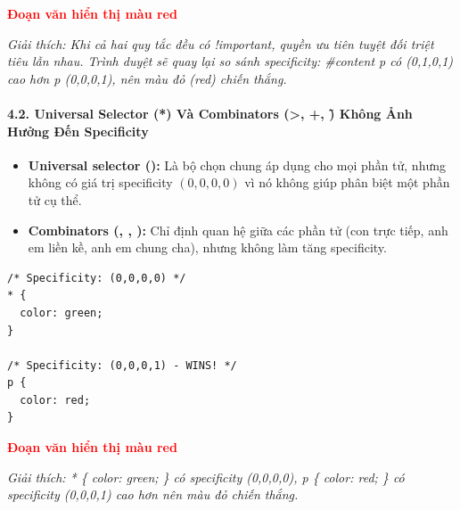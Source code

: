 \begin{browserWindow}
\sffamily\small
\textcolor{red}{\textbf{Đoạn văn hiển thị màu red}} \par\vspace{4pt}
{\scriptsize\textcolor{gray!60}{\textit{Giải thích: Khi cả hai quy tắc đều có !important, quyền ưu tiên tuyệt đối triệt tiêu lẫn nhau. Trình duyệt sẽ quay lại so sánh specificity: \#content p có (0,1,0,1) cao hơn p (0,0,0,1), nên màu đỏ (red) chiến thắng.}}}
\end{browserWindow}

\paragraph{4.2. Universal Selector (*) Và Combinators (>, +, \~) Không Ảnh Hưởng Đến Specificity}

\begin{conceptBox}
\begin{itemize}[leftmargin=1.5em, itemsep=3pt, parsep=0pt]
    \item \textbf{Universal selector (\codeinline{*}):} Là bộ chọn chung áp dụng cho mọi phần tử, nhưng không có giá trị specificity $(0,0,0,0)$ vì nó không giúp phân biệt một phần tử cụ thể.
    \item \textbf{Combinators (\codeinline{>}, \codeinline{+}, \codeinline{\~{}}):} Chỉ định quan hệ giữa các phần tử (con trực tiếp, anh em liền kề, anh em chung cha), nhưng không làm tăng specificity.
\end{itemize}
\end{conceptBox}

\begin{codeWindow}
\begin{lstlisting}[language=CSS3]
/* Specificity: (0,0,0,0) */
* {
  color: green;
}

/* Specificity: (0,0,0,1) - WINS! */
p {
  color: red;
}
\end{lstlisting}
\end{codeWindow}

\begin{browserWindow}
\sffamily\small
\textcolor{red}{\textbf{Đoạn văn hiển thị màu red}} \par\vspace{4pt}
{\scriptsize\textcolor{gray!60}{\textit{Giải thích: * \{ color: green; \} có specificity (0,0,0,0), p \{ color: red; \} có specificity (0,0,0,1) cao hơn nên màu đỏ chiến thắng.}}}
\end{browserWindow}

